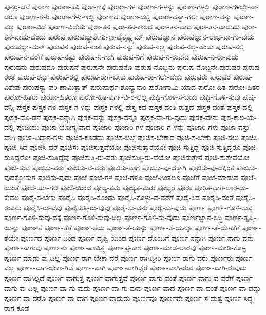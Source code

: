 {ಪುನರ್ರ-ಚನೆ
ಪುರಾಣ
ಪುರಾಣ-ಕವಿ
ಪುರಾ-ಣಕ್ಕೆ
ಪುರಾಣ-ಗಳ
ಪುರಾಣ-ಗ-ಳನ್ನು
ಪುರಾಣ-ಗಳಲ್ಲಿ
ಪುರಾಣ-ಗಳಲ್ಲೇ-ನಾ-ದರೂ
ಪುರಾಣ-ಗಳು
ಪುರಾಣ-ಗಳು-ಇಲ್ಲಿ
ಪುರಾಣದ
ಪುರಾಣ-ದಲ್ಲಿ
ಪುರಾಣ-ವನ್ನಾ-ಗಲೀ
ಪುರಾಣ-ವನ್ನು
ಪುರಾಣ-ವಲ್ಲ
ಪುರಾಣ-ವಿದೆ
ಪುರಾಣ-ವಿದೆಯೆ
ಪುರಾ-ತನ
ಪುರಾ-ತನ-ಕಾಲದ
ಪುರಾ-ತನ-ವಾದ
ಪುರಾ-ತನ-ವಾದುದು
ಪುರಾ-ತನ-ವಾದು-ದೆಂದು
ಪುರುಷ
ಪುರುಷಖ್ಯಾತೇರ್ಗುಣ-ವೈತೃಷ್ಣ್ಯಮ್
ಪುರುಷಜ್ಞಾನ
ಪುರುಷಜ್ಞಾನ-ಲಾಭ-ವಾ-ಗು-ವುದು
ಪುರುಷಜ್ಞಾ-ಮನ್
ಪುರುಷನ
ಪುರುಷ-ನಂತೆ
ಪುರುಷ-ನನ್ನು
ಪುರುಷ-ನಲ್ಲ
ಪುರುಷ-ನಲ್ಲ-ವೆಂದು
ಪುರುಷ-ನಲ್ಲಿ
ಪುರುಷ-ನ-ವರೆಗೆ
ಪುರುಷ-ನಷ್ಟು
ಪುರುಷ-ನಿ-ಗಾಗಿ
ಪುರುಷ-ನಿಗೆ
ಪುರುಷ-ನಿ-ರುವನು
ಪುರುಷ-ನಿ-ರು-ವುದು
ಪುರುಷನು
ಪುರುಷನೂ
ಪುರುಷನೆ
ಪುರುಷನೇ
ಪುರುಷನೊ
ಪುರುಷ-ನೊಬ್ಬನು
ಪುರುಷ-ನೊಬ್ಬನೇ
ಪುರುಷರ
ಪುರುಷ-ರಂತೆ
ಪುರುಷ-ರನ್ನು
ಪುರುಷ-ರಲ್ಲಿ
ಪುರುಷ-ರಾಗ-ಬೇಕು
ಪುರುಷ-ರಾ-ಗಲೇ-ಬೇಕು
ಪುರುಷರು
ಪುರುಷರೆ
ಪುರುಷ-ವಿಶೇಷ
ಪುರುಷಸ್ಯಾ-ಪರಿ-ಣಾಮಿತ್ವಾತ್
ಪುರುಷಾರ್ಥ-ಶೂನ್ಯಾನಾಂ
ಪುರೋಗಾಮಿ-ಯಾದ
ಪುರೋ-ಹಿತ
ಪುರೋ-ಹಿತರ
ಪುರೋ-ಹಿತರು
ಪುರೋ-ಹಿತರೂ
ಪುರೋ-ಹಿತ-ವರ್ಗ-ವಿ-ರ-ಲಿಲ್ಲ
ಪುಷ್ಟಿ-ಗೊಳಿ-ಸ-ಬೇಕು
ಪುಷ್ಟಿ-ಗೊಳಿ-ಸುವು
ಪುಷ್ಪ-ವೆನ್ನಿ
ಪುಸ್ತಕ
ಪುಸ್ತಕ-ಗಳ
ಪುಸ್ತಕ-ಗ-ಳನ್ನು
ಪುಸ್ತಕ-ಗಳಲ್ಲಿ
ಪುಸ್ತ-ಕದ
ಪುಸ್ತಕ-ದಂತಿ-ರುತ್ತದೆ
ಪುಸ್ತಕ-ದಂತೆ
ಪುಸ್ತಕ-ದಲ್ಲಿ
ಪುಸ್ತಕ-ದೊ-ಡನೆ
ಪುಸ್ತಕ-ವನ್ನಾಗಿ
ಪುಸ್ತಕ-ವನ್ನು
ಪುಸ್ತಕ-ವನ್ನೂ
ಪುಸ್ತಕ-ವಾ-ಗು-ವುದು
ಪುಸ್ತಕ-ವೇನು
ಪುಸ್ತ-ಕಾಲ-ಯ-ದಲ್ಲಿ
ಪೂಜಯು
ಪೂಜಾ-ಯೋಗ್ಯ-ವಾದ
ಪೂಜಾರಿ
ಪೂಜಾರಿ-ಗಳ
ಪೂಜಾರಿ-ಗ-ಳನ್ನು
ಪೂಜಾರಿ-ಗಳು
ಪೂಜಾ-ವಸ್ತು-ವಾಗಿ
ಪೂಜಾ-ವಿಧಾನ-ಗಳು
ಪೂಜಿಸ-ಕೂಡದು
ಪೂಜಿಸ-ಬಲ್ಲೆ
ಪೂಜಿಸ-ಬೇಕಾದ
ಪೂಜಿ-ಸ-ಬೇಕು
ಪೂಜಿ-ಸಲು
ಪೂಜಿಸಿ
ಪೂಜಿ-ಸಿದ
ಪೂಜಿಸಿ-ದರೆ
ಪೂಜಿಸು
ಪೂಜಿಸುತ್ತವೆಯೋ
ಪೂಜಿಸುತ್ತಾರೆಯೋ
ಪೂಜಿ-ಸುತ್ತಿದ್ದ
ಪೂಜಿ-ಸುತ್ತಿದ್ದರೂ
ಪೂಜಿ-ಸುತ್ತಿದ್ದರೋ
ಪೂಜಿ-ಸುತ್ತಿದ್ದೆವು
ಪೂಜಿಸುತ್ತಿ-ರು-ವರು
ಪೂಜಿಸುತ್ತಿ-ರು-ವೆಯೋ
ಪೂಜಿಸುತ್ತೇನೆ
ಪೂಜಿ-ಸುತ್ತೇವೆಯೋ
ಪೂಜಿ-ಸುವ
ಪೂಜಿಸು-ವರು
ಪೂಜಿಸು-ವ-ವರು
ಪೂಜಿಸು-ವಾಗ
ಪೂಜಿಸು-ವು-ದಕ್ಕಾಗಿ
ಪೂಜಿಸು-ವು-ದಕ್ಕಿಂತ
ಪೂಜಿಸು-ವುದಕ್ಕೋಸುಗ
ಪೂಜಿಸು-ವುದು
ಪೂಜೆ
ಪೂಜೆ-ಗಳ
ಪೂಜೆ-ಗಳೂ
ಪೂಜೆ-ಗಿಂತಲೂ
ಪೂಜೆಗೆ
ಪೂಜೆ-ಮಾಡುವ
ಪೂಜೆ-ಯಂತೆ
ಪೂಜೆ-ಯಾ-ಗಲಿ
ಪೂಜೆ-ಯಿಂದ
ಪೂಜ್ಯ-ತಮ
ಪೂಜ್ಯತ-ಮರು
ಪೂಜ್ಯರೆ
ಪೂರಕ
ಪೂರಿತ-ವಾಗ-ಲಾರ-ದು-ಕೇವಲ
ಪೂರೈ-ಸ-ಬೇಕು
ಪೂರೈಸಿ
ಪೂರೈಸಿ-ಕೊಂಡು
ಪೂರೈಸಿ-ಕೊಳ್ಳು-ವ-ವರೆಗೆ
ಪೂರೈ-ಸಿದ
ಪೂರೈಸಿ-ದಂತೆ
ಪೂರೈಸಿ-ರುವನು
ಪೂರೈಸಿ-ರು-ವೆವು
ಪೂರೈಸುತ್ತಿ-ರು-ವುವು
ಪೂರೈ-ಸು-ವನು
ಪೂರೈ-ಸು-ವುದು
ಪೂರ್ಣ
ಪೂರ್ಣ-ಗೊಳಿ-ಸುವ
ಪೂರ್ಣ-ಗೊಳಿ-ಸುವು-ದಕ್ಕೆ
ಪೂರ್ಣ-ಗೊಳಿ-ಸುವು-ದಿಲ್ಲ
ಪೂರ್ಣ-ಗೊಳಿ-ಸು-ವುದು
ಪೂರ್ಣಜ್ಞಾನ-ಸಿದ್ಧಿ
ಪೂರ್ಣ-ತೃಪ್ತಿ-ಯನ್ನು
ಪೂರ್ಣತೆ
ಪೂರ್ಣ-ತೆಗೆ
ಪೂರ್ಣ-ತೆಯ
ಪೂರ್ಣ-ತೆ-ಯನ್ನು
ಪೂರ್ಣ-ತೆ-ಯನ್ನೂ
ಪೂರ್ಣ-ತೆ-ಯೆ-ಡೆಗೆ
ಪೂರ್ಣ-ತೆಯೇ
ಪೂರ್ಣದ
ಪೂರ್ಣ-ದಿಂದ
ಪೂರ್ಣ-ದೃಷ್ಟಿ-ಯಿಂದ
ಪೂರ್ಣ-ದೊಂದಿಗೆ
ಪೂರ್ಣ-ನನ್ನಾಗಿ
ಪೂರ್ಣ-ನಾಗು-ವನು
ಪೂರ್ಣ-ನಾಗುವು
ಪೂರ್ಣನು
ಪೂರ್ಣ-ಪಾವಿತ್ರ್ಯ
ಪೂರ್ಣಪ್ರ-ಕಾಶ
ಪೂರ್ಣ-ಮಾಡ-ಲಾರವು
ಪೂರ್ಣ-ಮಾಡಿ-ಕೊಳ್ಳ
ಪೂರ್ಣ-ಮಾಡು-ವು-ದಿಲ್ಲ
ಪೂರ್ಣ-ರಾಗ-ಬೇಕಾ-ದರೆ
ಪೂರ್ಣ-ರಾಗಿದ್ದೀರಿ
ಪೂರ್ಣ-ರಾಗು-ವರು
ಪೂರ್ಣರು
ಪೂರ್ಣ-ವಲ್ಲ
ಪೂರ್ಣ-ವಾಗ-ಬೇಕಾ-ಗಿದೆ
ಪೂರ್ಣ-ವಾಗಿ
ಪೂರ್ಣ-ವಾಗಿದ್ದರೆ
ಪೂರ್ಣ-ವಾಗಿ-ರುವ
ಪೂರ್ಣ-ವಾಗಿ-ರುವುದು
ಪೂರ್ಣ-ವಾಗಿಲ್ಲದೆ
ಪೂರ್ಣ-ವಾಗುತ್ತ
ಪೂರ್ಣ-ವಾಗುತ್ತವೆ
ಪೂರ್ಣ-ವಾಗು-ವಂತೆ
ಪೂರ್ಣ-ವಾಗು-ವ-ವರೆಗೆ
ಪೂರ್ಣ-ವಾಗು-ವು-ದಿಲ್ಲ
ಪೂರ್ಣ-ವಾ-ಗು-ವುದು
ಪೂರ್ಣ-ವಾ-ಗು-ವುವು
ಪೂರ್ಣ-ವಾದ
ಪೂರ್ಣ-ವಾ-ದಂತೆ
ಪೂರ್ಣ-ವಾ-ದದ್ದು
ಪೂರ್ಣ-ವಾ-ದರೊ
ಪೂರ್ಣ-ವಾ-ದಾಗ
ಪೂರ್ಣ-ವಾದುದು
ಪೂರ್ಣವೂ
ಪೂರ್ಣವೇ
ಪೂರ್ಣ-ಸ-ಮತ್ವ
ಪೂರ್ಣ-ಸಿದ್ಧ-ರಾಗ-ಕೂಡ
}
